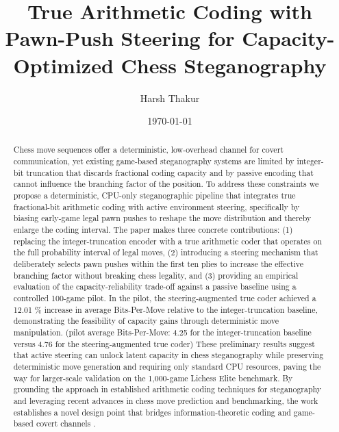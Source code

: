 \documentclass[journal]{IEEEtran}
\title{True Arithmetic Coding with Pawn-Push Steering for Capacity-Optimized Chess Steganography}
\author{Harsh Thakur}
\date{\today}
\begin{document}
\sloppy
{}
\setlength{\emergencystretch}{3.5em}
\setlength{\hfuzz}{2pt}
\maketitle
\begin{abstract}
Chess move sequences offer a deterministic, low-overhead channel for covert communication, yet existing game-based steganography systems are limited by integer-bit truncation that discards fractional coding capacity and by passive encoding that cannot influence the branching factor of the position. To address these constraints we propose a deterministic, CPU-only steganographic pipeline that integrates true fractional-bit arithmetic coding with active environment steering, specifically by biasing early-game legal pawn pushes to reshape the move distribution and thereby enlarge the coding interval. The paper makes three concrete contributions: (1) replacing the integer-truncation encoder with a true arithmetic coder that operates on the full probability interval of legal moves, (2) introducing a steering mechanism that deliberately selects pawn pushes within the first ten plies to increase the effective branching factor without breaking chess legality, and (3) providing an empirical evaluation of the capacity-reliability trade-off against a passive baseline using a controlled 100-game pilot. In the pilot, the steering-augmented true coder achieved a 12.01 \% increase in average Bits-Per-Move relative to the integer-truncation baseline, demonstrating the feasibility of capacity gains through deterministic move manipulation. (pilot average Bits-Per-Move: 4.25 for the integer-truncation baseline versus 4.76 for the steering-augmented true coder) These preliminary results suggest that active steering can unlock latent capacity in chess steganography while preserving deterministic move generation and requiring only standard CPU resources, paving the way for larger-scale validation on the 1,000-game Lichess Elite benchmark. By grounding the approach in established arithmetic coding techniques for steganography and leveraging recent advances in chess move prediction and benchmarking, the work establishes a novel design point that bridges information-theoretic coding and game-based covert channels \cite{shen2020nearimpercepti, nasution2018imagesteganogr, baraskar2018truecolor, durge2026crossdataset, walker2026chessworld, ruoss2024amortizedplann} \cite{shen2020nearimpercepti, nasution2018imagesteganogr, baraskar2018truecolor, durge2026crossdataset, walker2026chessworld, ruoss2024amortizedplann}.
\end{abstract}
\end{document}
